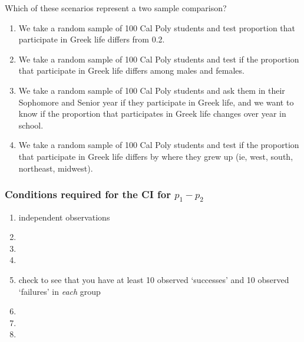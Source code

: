 \begin{frame}
\begin{clicker}{Which of these scenarios represent a two sample comparison?}
\begin{enumerate}
    \item
    We take a random sample of 100 Cal Poly students and test proportion that participate in Greek life differs from 0.2.
    \item
    We take a random sample of 100 Cal Poly students and test if the proportion that participate in Greek life differs among males and females.
    \item
    We take a random sample of 100 Cal Poly students and ask them in their Sophomore and Senior year if they participate in Greek life, and we want to know if the proportion that participates in Greek life changes over year in school.
    \item
    We take a random sample of 100 Cal Poly students and test if the proportion that participate in Greek life differs by where they grew up (ie, west, south, northeast, midwest).
\end{enumerate}
\end{clicker}
\end{frame}

\begin{frame}
\frametitle{Conditions required for the CI for $p_1-p_2$}
\begin{enumerate}
    \item
    independent observations
    \item[]
    \item[]
    \item[]
    \item
    check to see that you have at least 10 observed `successes' and 10 observed `failures' in \emph{each} group
    \item[]
    \item[]
    \item[]
\end{enumerate}
\end{frame}


